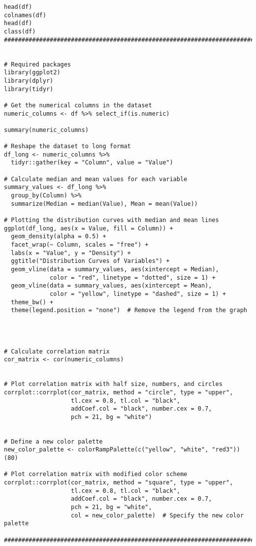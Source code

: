 \documentclass[12pt, a4paper,oneside]{book}
\numberwithin{equation}{section}
\begin{document}
\begin{lstlisting}
head(df)
colnames(df)
head(df)
class(df)
#########################################################################################################


# Required packages
library(ggplot2)
library(dplyr)
library(tidyr)

# Get the numerical columns in the dataset
numeric_columns <- df %>% select_if(is.numeric)

summary(numeric_columns)

# Reshape the dataset to long format
df_long <- numeric_columns %>%
  tidyr::gather(key = "Column", value = "Value")

# Calculate median and mean values for each variable
summary_values <- df_long %>%
  group_by(Column) %>%
  summarize(Median = median(Value), Mean = mean(Value))

# Plotting the distribution curves with median and mean lines
ggplot(df_long, aes(x = Value, fill = Column)) +
  geom_density(alpha = 0.5) +
  facet_wrap(~ Column, scales = "free") +
  labs(x = "Value", y = "Density") +
  ggtitle("Distribution Curves of Variables") +
  geom_vline(data = summary_values, aes(xintercept = Median),
             color = "red", linetype = "dotted", size = 1) +
  geom_vline(data = summary_values, aes(xintercept = Mean),
             color = "yellow", linetype = "dashed", size = 1) +
  theme_bw() +
  theme(legend.position = "none")  # Remove the legend from the graph




# Calculate correlation matrix
cor_matrix <- cor(numeric_columns)


# Plot correlation matrix with half size, numbers, and circles
corrplot::corrplot(cor_matrix, method = "circle", type = "upper",
                   tl.cex = 0.8, tl.col = "black",
                   addCoef.col = "black", number.cex = 0.7,
                   pch = 21, bg = "white")


# Define a new color palette
new_color_palette <- colorRampPalette(c("yellow", "white", "red3"))(80)

# Plot correlation matrix with modified color scheme
corrplot::corrplot(cor_matrix, method = "square", type = "upper",
                   tl.cex = 0.8, tl.col = "black",
                   addCoef.col = "black", number.cex = 0.7,
                   pch = 21, bg = "white",
                   col = new_color_palette)  # Specify the new color palette

####################################################################################


\end{lstlisting}
\end{document}
